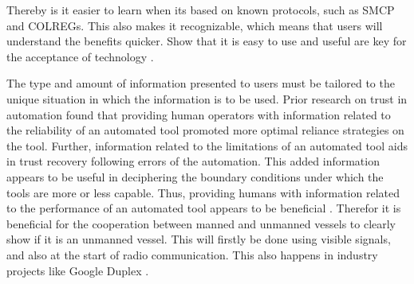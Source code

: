 Thereby is it easier to learn when its based on known protocols, such as \acf{SMCP} and \ac{COLREGs}. This also makes it recognizable, which means that users will understand the benefits quicker. Show that it is easy to use and useful are key for the acceptance of technology \cite{Davis1989}.

The type and amount of information presented to users must be tailored to the unique situation in which the information is to be used. Prior research on trust in automation found that providing human operators with information related to the reliability of an automated tool promoted more optimal reliance strategies on the tool. Further, information related to the limitations of an automated tool aids in trust recovery following errors of the automation. This added information appears to be useful in deciphering the boundary conditions under which the tools are more or less capable. Thus, providing humans with information related to the performance of an automated tool appears to be beneficial \cite{Lyons2014}. Therefor it is beneficial for the cooperation between manned and unmanned vessels to clearly show if it is an unmanned vessel. This will firstly be done using visible signals, and also at the start of radio communication. This also happens in industry projects like Google Duplex \cite{Nieva2018}.